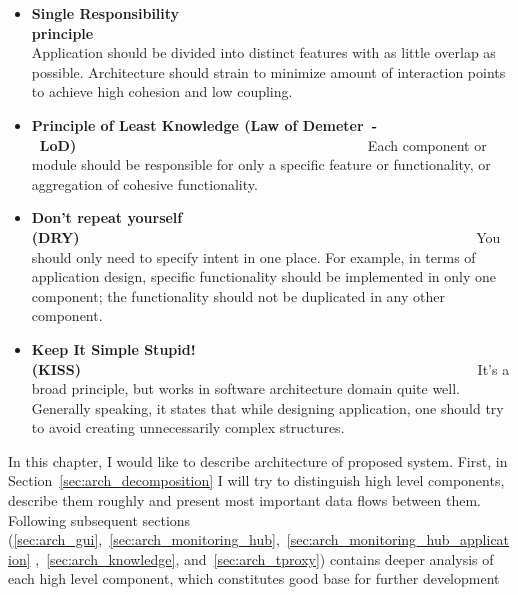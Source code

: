 \begin{itemize}

\item {\bf Single Responsibility
principle}~~~~~~~~~~~~~~~~~~~~~~~~~~~~~~~~~~~~~~~~~~~~~~~~~~~~~~~~\linebreak
Application should be divided into distinct features with as little overlap as possible. Architecture should strain to minimize amount of interaction points to achieve high cohesion and low coupling.

\item {\bf Principle of Least Knowledge (Law of Demeter~-~LoD)}~~~~~~~~~~~~~~~~~~~~~~~~~~~~~~~~~~~~~~~~~\linebreak
Each component or module should be responsible for only a specific feature or functionality, or aggregation of cohesive functionality.

\item {\bf Don't repeat yourself (DRY)}~~~~~~~~~~~~~~~~~~~~~~~~~~~~~~~~~~~~~~~~~~~~~~~~~~~~~~~~\linebreak
You should only need to specify intent in one place. For example, in terms of application design, specific functionality should be implemented in only one component; the functionality should not be duplicated in any other component.

\item {\bf Keep It Simple Stupid! (KISS)}~~~~~~~~~~~~~~~~~~~~~~~~~~~~~~~~~~~~~~~~~~~~~~~~~~~~~~~~\linebreak
It's a broad principle, but works in software architecture domain quite well. Generally speaking, it states that while designing application, one should try to avoid creating unnecessarily complex structures.

\end{itemize}

In this chapter, I would like to describe architecture of proposed system. First, in Section~\ref{sec:arch_decomposition} I will try to distinguish high level components, describe them roughly and present most important data flows between them. Following subsequent sections (\ref{sec:arch_gui},~\ref{sec:arch_monitoring_hub},~\ref{sec:arch_monitoring_hub_application} ,~\ref{sec:arch_knowledge}, and~\ref{sec:arch_tproxy}) contains deeper analysis of each high level component, which constitutes good base for further development













